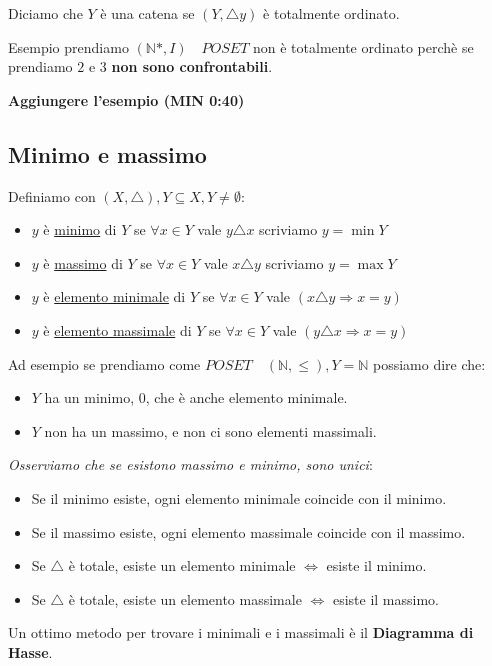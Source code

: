 \documentclass{article}
\begin{document}
Diciamo che $Y$ è una catena se $(Y, \triangle y)$ è totalmente ordinato. \par

Esempio prendiamo $(\mathbb{N}*, I) \quad POSET$ non è totalmente ordinato perchè se prendiamo $2$ e $3$ \textbf{non sono confrontabili}. \par
\textbf{Aggiungere l'esempio (MIN 0:40)}


\subsection{Minimo e massimo}
Definiamo con $(X, \triangle), Y \subseteq X, Y \not = \emptyset$:
\begin{itemize}
        \item $y$ è \underline{minimo} di $Y$ se $\forall x \in Y$  vale $y \triangle x$ scriviamo $y = \min Y$
        \item $y$ è \underline{massimo} di $Y$ se $\forall x \in Y$  vale $x \triangle y$ scriviamo $y = \max Y$
        \item $y$ è \underline{elemento minimale} di $Y$ se $\forall x \in Y$  vale $(x \triangle y \Rightarrow x = y)$
        \item $y$ è \underline{elemento massimale} di $Y$ se $\forall x \in Y$  vale $(y \triangle x \Rightarrow x = y)$
\end{itemize}

Ad esempio se prendiamo come $POSET \quad (\mathbb{N}, \le), Y = \mathbb{N}$ possiamo dire che:
\begin{itemize}
        \item $Y$ ha un minimo, $0$, che è anche elemento minimale.
        \item $Y$ non ha un massimo, e non ci sono elementi massimali. 
\end{itemize}

\textit{Osserviamo che se esistono massimo e minimo, sono unici}:
\begin{itemize}
        \item Se il minimo esiste, ogni elemento minimale coincide con il minimo.
        \item Se il massimo esiste, ogni elemento massimale coincide con il massimo.
        \item Se $\triangle$ è totale, esiste un elemento minimale $\Leftrightarrow$ esiste il minimo.
        \item Se $\triangle$ è totale, esiste un elemento massimale $\Leftrightarrow$ esiste il massimo. 
\end{itemize}


Un ottimo metodo per trovare i minimali e i massimali è il \textbf{Diagramma di Hasse}. \par
\end{document}
